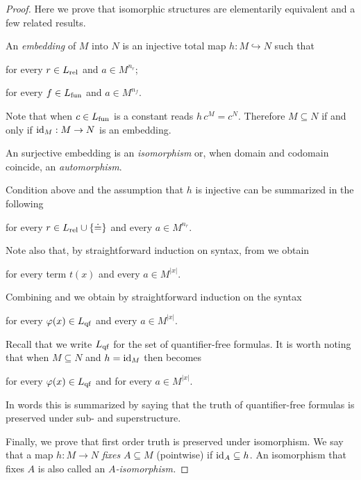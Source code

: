 \begin{proof}
Here we prove that isomorphic structures are elementarily equivalent and a few related results.

\begin{definition}\label{isomorfismodef}
An \emph{embedding\/} of $M$ into $N$ is an injective total map $h:M\hookrightarrow N$ such that

\hfill for every $r\in L_{\rm rel}$ and $a\in M^{n_r}$;

\hfill for every $f\in L_{\rm fun}$ and $a\in M^{n_f}$.

Note that when $c\in L_{\rm fun}$ is a constant  reads $h\,c^M=c^N$.
Therefore $M\subseteq N$ if and only if $\id_M:M\imp N$ is an embedding.

An surjective embedding is an \emph{isomorphism} or, when domain and codomain coincide, an \emph{automorphism}.
\end{definition}

Condition  above and the assumption that $h$ is injective can be summarized in the following

\hfill for every $r\in L_{\rm rel}\cup\{\doteq\}$ and every $a\in M^{n_r}$.

Note also that, by straightforward induction on syntax, from  we obtain

\hfill for every term $t(x)$ and every  $a\in M^{|x|}$.

Combining  and  we obtain by straightforward induction on the syntax

\hfill for every $\phi(x)\in L_{\rm qf}$ and every $a\in M^{|x|}$.

Recall that we write $L_{\rm qf}$ for the set of quantifier-free formulas.
It is worth noting that when $M\subseteq N$ and $h=\id_M$ then  becomes 

\hfill for every $\phi(x)\in L_{\rm qf}$ and for every $a\in M^{|x|}$.

In words this is summarized by saying that the truth of quantifier-free formulas is preserved under sub- and superstructure.

Finally, we prove that first order truth is preserved under isomorphism.
We say that a map $h:M\to N$ \emph{fixes\/} $A\subseteq M$ (pointwise) if $\id_A\subseteq h$.
An isomorphism that fixes $A$ is also called an \emph{$A$-isomorphism.}


\end{proof}
